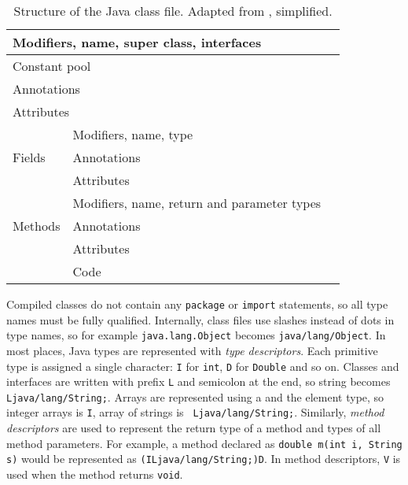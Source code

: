\begin{table}
    \begin{center}
        \label{classfile}
        \begin{tabular}{|l|l|l|}
            \hline
            \multicolumn{2}{|l|}{Modifiers, name, super class, interfaces} \\
            \hline
            \multicolumn{2}{|l|}{Constant pool} \\
            \hline
            \multicolumn{2}{|l|}{Annotations} \\
            \hline
            \multicolumn{2}{|l|}{Attributes} \\
            \hline
            \multirow{3}{*}{Fields} & Modifiers, name, type \\
            & Annotations \\
            & Attributes \\
            \hline
            \multirow{3}{*}{Methods} & Modifiers, name, return and parameter types \\
            & Annotations \\
            & Attributes \\
            & Code \\
            \hline
        \end{tabular}
        \caption{Structure of the Java class file. Adapted from \cite{asmguide},
        simplified.}
    \end{center}
\end{table}

Compiled classes do not contain any \texttt{package} or \texttt{import}
statements, so all type names must be fully qualified. Internally, class files
use slashes instead of dots in type names, so for example
\texttt{java.lang.Object} becomes \texttt{java/lang/Object}. In most places,
Java types are represented with \emph{type descriptors}. Each primitive type is
assigned a single character: \texttt{I} for \texttt{int}, \texttt{D} for
\texttt{Double} and so on. Classes and interfaces are written with prefix
\texttt{L} and semicolon at the end, so string becomes
\texttt{Ljava/lang/String;}. Arrays are represented using a
\texttt{\leftbracket} and the element type, so integer arrays is
\texttt{\leftbracket I}, array of strings is \texttt{\leftbracket
Ljava/lang/String;}. Similarly, \emph{method descriptors} are used to represent
the return type of a method and types of all method parameters. For example, a
method declared as \texttt{double m(int i, String s)} would be represented as
\texttt{(ILjava/lang/String;)D}. In method descriptors, \texttt{V} is used when
the method returns \texttt{void}.

